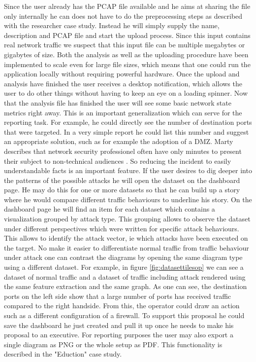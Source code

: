 Since the user already has the PCAP file available and he aims at sharing the file only internally he can does not have to do the preprocessing steps as described with the researcher case study. Instead he will simply supply the name, description and PCAP file and start the upload process. Since this input contains real network traffic we suspect that this input file can be multiple megabytes or gigabytes of size. Both the analysis as well as the uploading procedure have been implemented to scale even for large file sizes, which means that one could run the application locally without requiring powerful hardware. Once the upload and analysis have finished the user receives a desktop notification, which allows the user to do other things without having to keep an eye on a loading spinner.
Now that the analysis file has finished the user will see some basic network state metrics right away. This is an important generalization which can serve for the reporting task. For example, he could directly see the number of destination ports that were targeted. In a very simple report he could list this number and suggest an appropriate solution, such as for example the adoption of a DMZ. Marty describes that network security professionel often have only minutes to present their subject to non-technical audiences \cite{appliedsecurityvisualization}. So reducing the incident to easily understandable facts is an important feature.
If the user desires to dig deeper into the patterns of the possible attacks he will open the dataset on the dashboard page. He may do this for one or more datasets so that he can build up a story where he would compare different traffic behaviours to underline his story. On the dashboard page he will find an item for each dataset which contains a visualization grouped by attack type. This grouping allows to observe the dataset under different perspectives which were written for specific attack behaviours. This allows to identify the attack vector, ie which attacks have been executed on the target. No make it easier to differentiate normal traffic from traffic behaviour under attack one can contrast the diagrams by opening the same diagram type using a different dataset. For example, in figure \ref{fig:datasettilesop} we can see a dataset of normal traffic and a dataset of traffic including attack rendered using the same feature extraction and the same graph. As one can see, the destination ports on the left side show that a large number of ports has received traffic compared to the right handside.
From this, the operator could draw an action such as a different configuration of a firewall. To support this proposal he could save the dashboard he just created and pull it up once he needs to make his proposal to an executive. For reporting purposes the user may also export a single diagram as PNG or the whole setup as PDF. This functionality is described in the "Eduction" case study.

